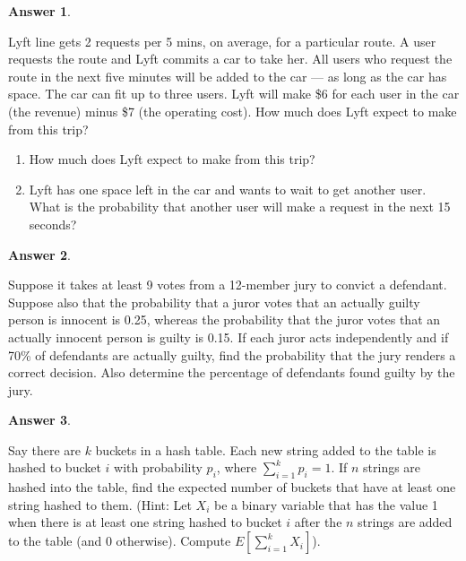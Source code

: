 \documentclass[12pt]{article}
\renewcommand{\(}{\left(}
\renewcommand{\)}{\right)}
\theoremstyle{definition}
\newtheorem*{answer}{Answer}
\begin{document}
\begin{enumerate}
{    \begin{shaded}
    \begin{answer}
    
    \end{answer}
    \end{shaded}
    \pagebreak
    \item Lyft line gets 2 requests per 5 mins, on average, for a particular route. A user requests the route and Lyft commits a car to take her. All users who request the route in the next five minutes will be added to the car --- as long as the car has space. The car can fit up to three users. Lyft will make \$6 for each user in the car (the revenue) minus \$7 (the operating cost). How much does Lyft expect to make from this trip?
    \begin{enumerate}
        \item How much does Lyft expect to make from this trip?
        \item Lyft has one space left in the car and wants to wait to get another user. What is the probability that another user will make a request in the next 15 seconds?
    \end{enumerate}
    
    \begin{shaded}
    \begin{answer}
    
    \end{answer}
    \end{shaded}
    \pagebreak
    \item Suppose it takes at least 9 votes from a 12-member jury to convict a defendant. Suppose also that the probability that a juror votes that an actually guilty person is innocent is 0.25, whereas the probability that the juror votes that an actually innocent person is guilty is 0.15. If each juror acts independently and if 70\% of defendants are actually guilty, find the probability that the jury renders a correct decision. Also determine the percentage of defendants found guilty by the jury.
    
    \begin{shaded}
    \begin{answer}
    
    \end{answer}
    \end{shaded}
    \pagebreak
    \item Say there are $k$ buckets in a hash table. Each new string added to the table is hashed to bucket $i$ with probability $p_i$, where $\displaystyle \sum_{i=1}^{k} p_i = 1$. If $n$ strings are hashed into the table, find the expected number of buckets that have at least one string hashed to them. (Hint: Let $X_i$ be a binary variable that has the value 1 when there is at least one string hashed to bucket $i$ after the $n$ strings are added to the table (and 0 otherwise). Compute $E[\sum_{i=1}^k X_i]$).
    
}
\end{enumerate}
\end{document}
